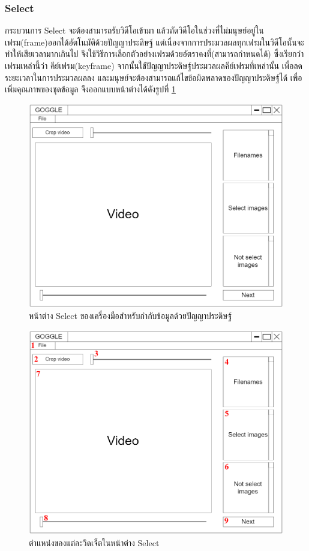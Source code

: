\subsubsection{Select}
กระบวนการ Select จะต้องสามารถรับวิดีโอเข้ามา แล้วตัดวิดีโอในช่วงที่ไม่มนุษย์อยู่ในเฟรม(frame)ออกได้อัตโนมัติด้วยปัญญาประดิษฐ์
แต่เนื่องจากการประมวลผลทุกเฟรมในวิดีโอนั้นจะทำให้เสียเวลามากเกินไป จึงใช้วิธีการเลือกตัวอย่างเฟรมด้วยอัตราคงที่(สามารถกำหนดได้)
ซึ่งเรียกว่าเฟรมเหล่านี้ว่า คีย์เฟรม(keyframe) จากนั้นใช้ปัญญาประดิษฐ์ประมวลผลคีย์เฟรมที่เหล่านั้น 
เพื่อลดระยะเวลาในการประมวลผลลง และมนุษย์จะต้องสามารถแก้ไขข้อผิดพลาดของปัญญาประดิษฐ์ได้ 
เพื่อเพิ่มคุณภาพของชุดข้อมูล จึงออกแบบหน้าต่างได้ดังรูปที่ \ref{fig:SelectDraft}

\begin{figure}[!ht]
    \centering
    \includegraphics[width=1\textwidth]{chapter3/images/3_6/SelectDraft.png}
    \caption{หน้าต่าง Select ของเครื่องมือสำหรับกำกับข้อมูลด้วยปัญญาประดิษฐ์}
    \label{fig:SelectDraft}
\end{figure}
\clearpage
\begin{figure}[!ht]
    \centering
    \includegraphics[width=1\textwidth]{chapter3/images/3_6/SelectDraft_point.png}
    \caption{ตำแหน่งของแต่ละวิดเจ็ตในหน้าต่าง Select}
    \label{fig:SelectDraft_point}
\end{figure}
